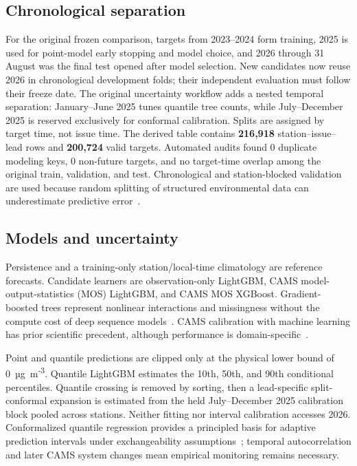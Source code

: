 \documentclass[11pt,a4paper]{article}
\begin{document}
\subsection{Chronological separation}
For the original frozen comparison, targets from 2023--2024 form training, 2025 is used for point-model early stopping and model choice, and 2026 through 31 August was the final test opened after model selection. New candidates now reuse 2026 in chronological development folds; their independent evaluation must follow their freeze date. The original uncertainty workflow adds a nested temporal separation: January--June 2025 tunes quantile tree counts, while July--December 2025 is reserved exclusively for conformal calibration. Splits are assigned by target time, not issue time. The derived table contains \textbf{216,918} station--issue--lead rows and \textbf{200,724} valid targets. Automated audits found 0 duplicate modeling keys, 0 non-future targets, and no target-time overlap among the original train, validation, and test. Chronological and station-blocked validation are used because random splitting of structured environmental data can underestimate predictive error~\cite{roberts}.

\subsection{Models and uncertainty}
Persistence and a training-only station/local-time climatology are reference forecasts. Candidate learners are observation-only LightGBM, CAMS model-output-statistics (MOS) LightGBM, and CAMS MOS XGBoost. Gradient-boosted trees represent nonlinear interactions and missingness without the compute cost of deep sequence models~\cite{lightgbm,xgboost}. CAMS calibration with machine learning has prior scientific precedent, although performance is domain-specific~\cite{wu}.

Point and quantile predictions are clipped only at the physical lower bound of 0~µg~m\textsuperscript{-3}. Quantile LightGBM estimates the 10th, 50th, and 90th conditional percentiles. Quantile crossing is removed by sorting, then a lead-specific split-conformal expansion is estimated from the held July--December 2025 calibration block pooled across stations. Neither fitting nor interval calibration accesses 2026. Conformalized quantile regression provides a principled basis for adaptive prediction intervals under exchangeability assumptions~\cite{romano}; temporal autocorrelation and later CAMS system changes mean empirical monitoring remains necessary.
\end{document}
